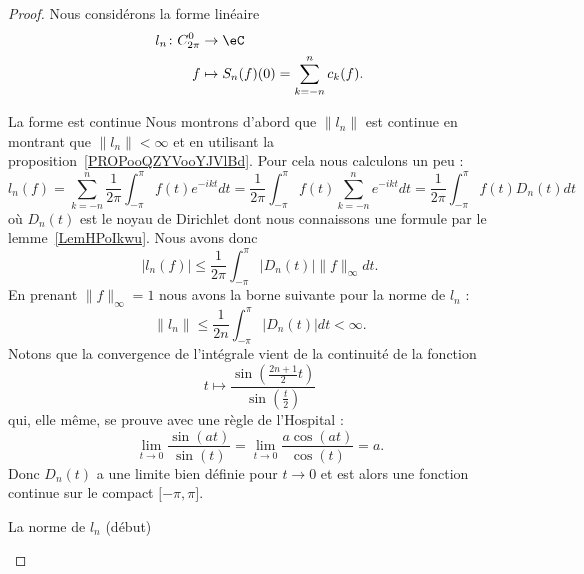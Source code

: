 \begin{proof}
	Nous considérons la forme linéaire
	\begin{equation}
		\begin{aligned}
			l_n\colon C^0_{2\pi} & \to \eC                                \\
			f                    & \mapsto S_n(f)(0)=\sum_{k=-n}^nc_k(f).
		\end{aligned}
	\end{equation}
	\begin{subproof}
		\item[La forme est continue]
		Nous montrons d'abord que \( \| l_n \|\) est continue en montrant que \( \| l_n \|<\infty\) et en utilisant la proposition~\ref{PROPooQZYVooYJVlBd}. Pour cela nous calculons un peu :
		\begin{equation}    \label{EqBELHGya}
			l_n(f)=\sum_{k=-n}^n\frac{1}{ 2\pi }\int_{-\pi}^{\pi}f(t) e^{-ikt}dt=\frac{1}{ 2\pi }\int_{-\pi}^{\pi}f(t)\sum_{k=-n}^n e^{-ikt}dt=\frac{1}{ 2\pi }\int_{-\pi}^{\pi}f(t)D_n(t)dt
		\end{equation}
		où \( D_n(t)\) est le noyau de Dirichlet dont nous connaissons une formule par le lemme~\ref{LemHPoIkwu}. Nous avons donc
		\begin{equation}
			| l_n(f) |\leq \frac{1}{ 2\pi }\int_{-\pi}^{\pi}| D_n(t) |\| f \|_{\infty}dt.
		\end{equation}
		En prenant \( \| f \|_{\infty}=1\) nous avons la borne suivante pour la norme de \( l_n\) :
		\begin{equation}        \label{EqBXoIUiD}
			\| l_n \|\leq \frac{1}{ 2n }\int_{-\pi}^{\pi}| D_n(t) |dt<\infty.
		\end{equation}
		Notons que la convergence de l'intégrale vient de la continuité de la fonction
		\begin{equation}
			t\mapsto \frac{ \sin\left( \frac{ 2n+1 }{2}t \right) }{ \sin\left( \frac{ t }{ 2 } \right) }
		\end{equation}
		qui, elle même, se prouve avec une règle de l'Hospital :
		\begin{equation}
			\lim_{t\to 0} \frac{ \sin(at) }{ \sin(t) }=\lim_{t\to 0} \frac{ a\cos(at) }{ \cos(t) }=a.
		\end{equation}
		Donc \( D_n(t)\) a une limite bien définie pour \( t\to 0\) et est alors une fonction continue sur le compact \( \mathopen[ -\pi , \pi \mathclose]\).

		\item[La norme de \( l_n\) (début)]


\end{subproof}
\end{proof}
